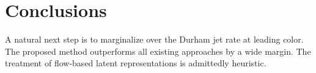 \section{Conclusions}\label{sec:conclusions}

A natural next step is to marginalize over the Durham jet rate at
leading color. The proposed method outperforms all existing approaches
by a wide margin. The treatment of flow-based latent representations is
admittedly heuristic.

